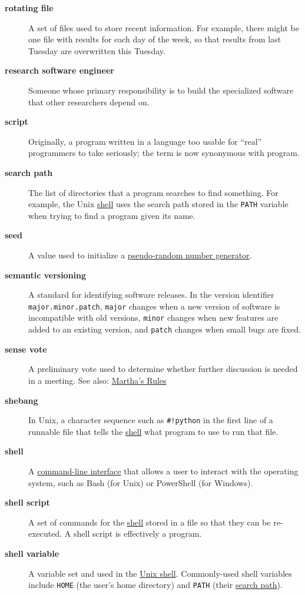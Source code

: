 \documentclass[
]{krantz}
\begin{document}
\begin{description}
\item[\textbf{rotating file}]
A set of files used to store recent information. For example, there might be one file with results for each day of the week, so that results from last Tuesday are overwritten this Tuesday.
\item[\textbf{research software engineer}]
Someone whose primary responsibility is to build the specialized software that other researchers depend on.
\item[\textbf{script}]
Originally, a program written in a language too usable for ``real'' programmers to take seriously; the term is now synonymous with program.
\item[\textbf{search path}]
The list of directories that a program searches to find something. For example, the Unix \protect\hyperlink{shell}{shell} uses the search path stored in the \texttt{PATH} variable when trying to find a program given its name.
\item[\textbf{seed}]
A value used to initialize a \protect\hyperlink{prng}{pseudo-random number generator}.
\item[\textbf{semantic versioning}]
A standard for identifying software releases. In the version identifier \texttt{major.minor.patch}, \texttt{major} changes when a new version of software is incompatible with old versions, \texttt{minor} changes when new features are added to an existing version, and \texttt{patch} changes when small bugs are fixed.
\item[\textbf{sense vote}]
A preliminary vote used to determine whether further discussion is needed in a meeting. See also: \protect\hyperlink{marthas_rules}{Martha's Rules}
\item[\textbf{shebang}]
In Unix, a character sequence such as \texttt{\#!python} in the first line of a runnable file that tells the \protect\hyperlink{shell}{shell} what program to use to run that file.
\item[\textbf{shell}]
A \protect\hyperlink{cli}{command-line interface} that allows a user to interact with the operating system, such as Bash (for Unix) or PowerShell (for Windows).
\item[\textbf{shell script}]
A set of commands for the \protect\hyperlink{shell}{shell} stored in a file so that they can be re-executed. A shell script is effectively a program.
\item[\textbf{shell variable}]
A variable set and used in the \protect\hyperlink{shell}{Unix shell}. Commonly-used shell variables include \texttt{HOME} (the user's home directory) and \texttt{PATH} (their \protect\hyperlink{search_path}{search path}).

\end{description}
\end{document}
